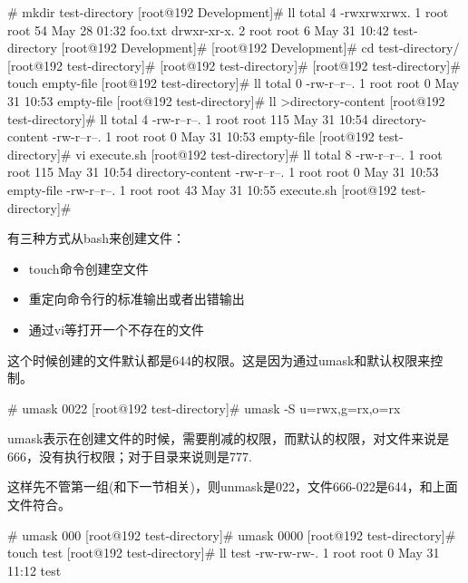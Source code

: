 
\begin{Bash}# mkdir test-directory
[root@192 Development]# ll
total 4
-rwxrwxrwx. 1 root root 54 May 28 01:32 foo.txt
drwxr-xr-x. 2 root root  6 May 31 10:42 test-directory
[root@192 Development]# 
[root@192 Development]# cd test-directory/
[root@192 test-directory]# 
[root@192 test-directory]# 
[root@192 test-directory]# touch empty-file
[root@192 test-directory]# ll
total 0
-rw-r--r--. 1 root root 0 May 31 10:53 empty-file
[root@192 test-directory]# ll >directory-content
[root@192 test-directory]# ll
total 4
-rw-r--r--. 1 root root 115 May 31 10:54 directory-content
-rw-r--r--. 1 root root   0 May 31 10:53 empty-file
[root@192 test-directory]# vi execute.sh
[root@192 test-directory]# ll
total 8
-rw-r--r--. 1 root root 115 May 31 10:54 directory-content
-rw-r--r--. 1 root root   0 May 31 10:53 empty-file
-rw-r--r--. 1 root root  43 May 31 10:55 execute.sh
[root@192 test-directory]# 

\end{Bash}

有三种方式从bash来创建文件：
\begin{itemize}
\item touch命令创建空文件
\item 重定向命令行的标准输出或者出错输出
\item 通过vi等打开一个不存在的文件
\end{itemize}

这个时候创建的文件默认都是644的权限。这是因为通过umask和默认权限来控制。

\begin{Bash}
# umask
0022
[root@192 test-directory]# umask -S
u=rwx,g=rx,o=rx
\end{Bash}

umask表示在创建文件的时候，需要削减的权限，而默认的权限，对文件来说是666，没有执行权限；对于目录来说则是777.

这样先不管第一组(和下一节相关)，则unmask是022，文件666-022是644，和上面文件符合。

\begin{Bash}# umask 000
[root@192 test-directory]# umask
0000
[root@192 test-directory]# touch test
[root@192 test-directory]# ll test
-rw-rw-rw-. 1 root root 0 May 31 11:12 test
\end{Bash}

